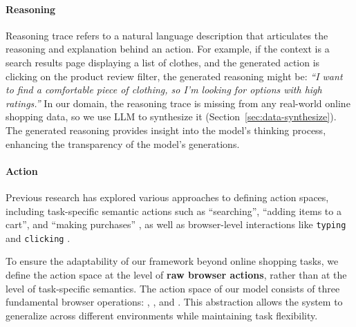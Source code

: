 \documentclass{article} %
\begin{document}
\paragraph{Reasoning}

Reasoning trace refers to a natural language description that articulates the reasoning and explanation behind an action.
For example, if the context is a search results page displaying a list of clothes, and the generated action is clicking on the  product review filter, the generated reasoning might be: \textit{``I want to find a comfortable piece of clothing, so I'm looking for options with high ratings.''}
In our domain, the reasoning trace is missing from any real-world online shopping data, so we use LLM to synthesize it (Section~\ref{sec:data-synthesize}).
The generated reasoning provides insight into the model's thinking process, enhancing the transparency of the model's generations.

\paragraph{Action}
Previous research has explored various approaches to defining action spaces, including task-specific semantic actions such as ``searching'', ``adding items to a cart'', and ``making purchases'' \cite{yaoWebShopScalableRealWorld2022}, as well as browser-level interactions like \texttt{typing} and \texttt{clicking} \cite{luUXAgentLLMAgentBased2025}. 

To ensure the adaptability of our framework beyond online shopping tasks, we define the action space at the level of \textbf{raw browser actions}, rather than at the level of task-specific semantics.
The action space of our model consists of three fundamental browser operations: , , and .
This abstraction allows the system to generalize across different environments while maintaining task flexibility.
\label{sec:action-definition}

\end{document}
